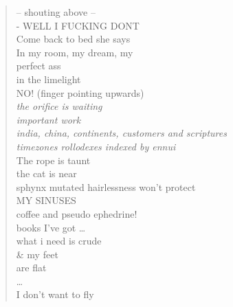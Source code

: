 \documentclass[11pt]{article}
\begin{document}
\begin{verse}
\vspace*{1em}
\hspace*{4em}-- shouting above --\\
\hspace*{8em}- WELL I FUCKING DONT\\
\vspace*{1em}
\hspace*{4em}Come back to bed she says\\
\hspace*{4em}In my room, my dream, my\\
\hspace*{8em}perfect ass\\
\hspace*{12em}in the limelight\\
NO! (finger pointing upwards)\\
\hspace*{2em}\emph{the orifice is waiting}\\
\hspace*{4em}\emph{important work}\\
\hspace*{8em}\emph{india, china, continents, customers and scriptures}\\
\hspace*{8em}\emph{timezones rollodexes indexed by ennui}\\
\vspace*{1em}
The rope is taunt\\
the cat is near\\
\hspace*{4em}sphynx mutated hairlessness won't protect\\
\hspace*{8em}MY SINUSES\\
\hspace*{12em}coffee and pseudo ephedrine!\\
\hspace*{16em}books I've got \ldots\\
\hspace*{8em}what i need is crude\\
\hspace*{12em}\& my feet\\
\hspace*{16em}are flat\\
\hspace*{20em}\ldots\\
\vspace*{1em}
\hspace*{12em}I don't want to fly\\

\end{verse}
\end{document}
